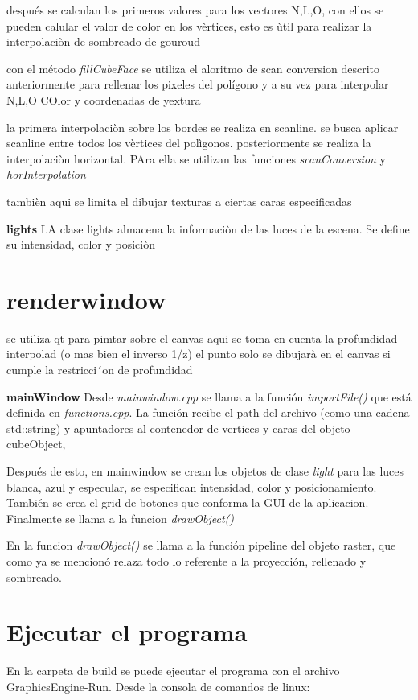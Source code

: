 \documentclass[12pt]{article}
\begin{document}
después se calculan los primeros valores para los vectores N,L,O, con ellos se pueden calular el valor de color en los vèrtices, esto es ùtil para realizar la interpolaciòn de sombreado de gouroud

con el método \textit{fillCubeFace} se utiliza el aloritmo de scan conversion descrito anteriormente para rellenar los pixeles del polígono y a su vez para interpolar N,L,O COlor y coordenadas de yextura 

la primera interpolaciòn sobre los bordes se realiza en scanline. se busca aplicar scanline entre todos los vèrtices del polìgonos. posteriormente se realiza la interpolaciòn horizontal. PAra ella se utilizan las funciones \textit{scanConversion} y \textit{horInterpolation}

tambièn aqui se limita el dibujar texturas a ciertas caras especificadas

\textbf{lights}
LA clase lights almacena la informaciòn de las luces de la escena. Se define su intensidad, color y posiciòn

\section{renderwindow}

se utiliza qt para pimtar sobre el canvas
aqui se toma en cuenta la profundidad interpolad (o mas bien el inverso 1/z)
el punto solo se dibujarà en el canvas si cumple la restricci´on de profundidad

\textbf{mainWindow}
Desde \textit{mainwindow.cpp} se llama a la función \textit{importFile()} que está definida en \textit{functions.cpp}. La función recibe el path del archivo (como una cadena std::string) y apuntadores al contenedor de vertices y caras del objeto cubeObject,


Después de esto, en mainwindow se crean los objetos de clase \textit{light} para las luces blanca, azul y especular, se especifican intensidad, color y posicionamiento. También se crea el grid de botones que conforma la GUI de la aplicacion. Finalmente se llama a la funcion \textit{drawObject()}

En la funcion  \textit{drawObject()} se llama a la función pipeline del objeto raster, que como ya se mencionó relaza todo lo referente a la proyección, rellenado y sombreado.


\section{Ejecutar el programa}
En la carpeta de build se puede ejecutar el programa con el archivo GraphicsEngine-Run. Desde la consola de comandos de linux:
\end{document}
